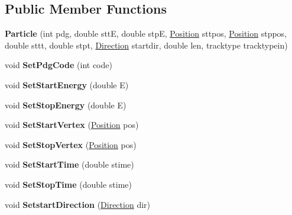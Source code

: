 \subsection*{Public Member Functions}
\begin{DoxyCompactItemize}
\item 
\hypertarget{classParticle_a10c8ee36554a8ad1d3f910537a88567a}{
{\bfseries Particle} (int pdg, double sttE, double stpE, \hyperlink{classPosition}{Position} sttpos, \hyperlink{classPosition}{Position} stppos, double sttt, double stpt, \hyperlink{classDirection}{Direction} startdir, double len, tracktype tracktypein)}
\label{classParticle_a10c8ee36554a8ad1d3f910537a88567a}

\item 
\hypertarget{classParticle_a1032e7cf325e073f2bbc7a0447c17780}{
void {\bfseries SetPdgCode} (int code)}
\label{classParticle_a1032e7cf325e073f2bbc7a0447c17780}

\item 
\hypertarget{classParticle_a83b748ccb2402b630ebc2be12b697383}{
void {\bfseries SetStartEnergy} (double E)}
\label{classParticle_a83b748ccb2402b630ebc2be12b697383}

\item 
\hypertarget{classParticle_a427b73c000394c699f92bee299208f84}{
void {\bfseries SetStopEnergy} (double E)}
\label{classParticle_a427b73c000394c699f92bee299208f84}

\item 
\hypertarget{classParticle_a44c601a3c061fd42a7be111ce47c1946}{
void {\bfseries SetStartVertex} (\hyperlink{classPosition}{Position} pos)}
\label{classParticle_a44c601a3c061fd42a7be111ce47c1946}

\item 
\hypertarget{classParticle_a534cc15b476cd65617c02711b6082a5a}{
void {\bfseries SetStopVertex} (\hyperlink{classPosition}{Position} pos)}
\label{classParticle_a534cc15b476cd65617c02711b6082a5a}

\item 
\hypertarget{classParticle_a71be9f9aef04cb704ab99df9da267b04}{
void {\bfseries SetStartTime} (double stime)}
\label{classParticle_a71be9f9aef04cb704ab99df9da267b04}

\item 
\hypertarget{classParticle_a02576e01713e80369ff7c7aa7ead331d}{
void {\bfseries SetStopTime} (double stime)}
\label{classParticle_a02576e01713e80369ff7c7aa7ead331d}

\item 
\hypertarget{classParticle_ae47d25ec4e0d67cada6f4ebcb7696255}{
void {\bfseries SetstartDirection} (\hyperlink{classDirection}{Direction} dir)}
\label{classParticle_ae47d25ec4e0d67cada6f4ebcb7696255}


\end{DoxyCompactItemize}
